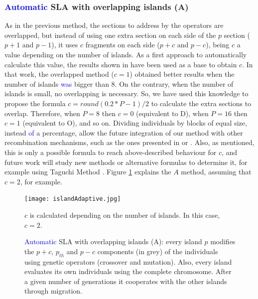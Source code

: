 \documentclass[preprint]{elsarticle}
\begin{document}
\subsubsection{\textcolor{blue}{Automatic} SLA with overlapping islands (A)} 
As in the previous method, the sections to address by the operators are overlapped, but
instead of using one extra section on each side of the $p$ section ($p+1$
and $p-1$), it uses $c$ fragments on each side ($p+c$ and $p-c$),
being $c$ a value depending on the number of islands.
As a first
approach to automatically calculate this value, the results shown in
\citep{Garcia16hpmoon} have been used as a base to obtain $c$. In that
work, the overlapped method ($c=1$) obtained better results when the
number of islands \textcolor{blue}{was} bigger than 8. On the contrary, when the number of
islands is small, no overlapping is necessary. So, we have used this
knowledge to propose the formula $c=round(0.2*P-1)/2$ to calculate the
extra sections to overlap. Therefore, when $P=8$ then $c=0$
(equivalent to D), when $P=16$ then $c=1$ (equivalent to O), and so
on. Dividing individuals by blocks of equal size, instead \textcolor{blue}{of} a percentage, allow the future integration of our method with other recombination mechanisms, such as the ones presented in \cite{Dorronsoro13superlinear} or \cite{Kimovski15Parallel}.
Also, as mentioned, this is only a possible formula to reach above-described behaviour for $c$, and future work will study new methods or alternative formulas to determine it, for example using Taguchi Method \cite{Keratmatpour2018Taguchi}.  Figure \ref{fig:adaptive} explains the $A$ method, assuming that $c=2$, for example. 

\begin{figure}[h!tb]
\centering
\texttt{[image: islandAdaptive.jpg]}
\caption{\textcolor{blue}{Automatic} SLA with overlapping islands (A): every island $p$ modifies the  $p+c$,
  $p_{th}$ and $p-c$  components (in grey) of the individuals using genetic operators (crossover and mutation). Also, every island evaluates its own individuals using the complete chromosome. After a given number of generations it cooperates with the other islands through migration.} $c$ is calculated depending on the number of islands. In this case, $c=2$.
  \label{fig:adaptive}
\end{figure}
\end{document}
